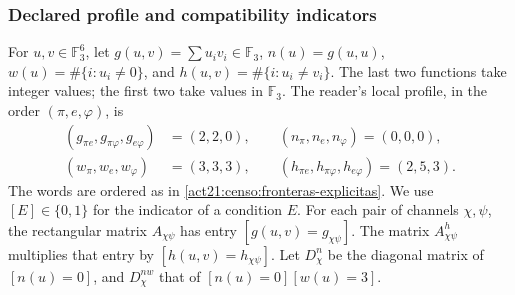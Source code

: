 \subsubsection{Declared profile and compatibility indicators}

For \(u,v\in\mathbb F_3^6\), let
\(g(u,v)=\sum u_iv_i\in\mathbb F_3\),
\(n(u)=g(u,u)\), \(w(u)=\#\{i:u_i\ne0\}\), and
\(h(u,v)=\#\{i:u_i\ne v_i\}\). The last two functions take
integer values; the first two take values in \(\mathbb F_3\).
The reader's local profile, in the order \((\pi,e,\varphi)\), is
\begin{equation}
 \begin{split}
 (g_{\pi e},g_{\pi\varphi},g_{e\varphi})&=(2,2,0),\qquad
 (n_\pi,n_e,n_\varphi)=(0,0,0),\\
 (w_\pi,w_e,w_\varphi)&=(3,3,3),\qquad
 (h_{\pi e},h_{\pi\varphi},h_{e\varphi})=(2,5,3).
 \end{split}
 \label{act21:censo:perfil-local}
\end{equation}
The words are ordered as in \eqref{act21:censo:fronteras-explicitas}.
We use \([E]\in\{0,1\}\) for the indicator of a condition \(E\).
For each pair of channels \(\chi,\psi\), the rectangular matrix
\(A_{\chi\psi}\) has entry \([g(u,v)=g_{\chi\psi}]\).
The matrix \(A^{h}_{\chi\psi}\) multiplies that entry by
\([h(u,v)=h_{\chi\psi}]\). Let \(D_\chi^n\) be the diagonal matrix
of \([n(u)=0]\), and \(D_\chi^{nw}\) that of
\([n(u)=0][w(u)=3]\).

